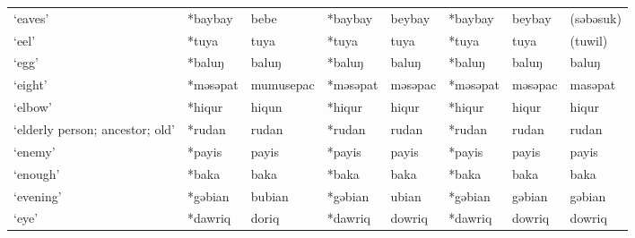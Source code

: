 \begin{landscape}
\begin{longtable}[c]{@{}p{3cm}<{\raggedright}p{2.75cm}<{\raggedright}p{2.75cm}<{\raggedright}p{2.75cm}<{\raggedright}p{2.75cm}<{\raggedright}p{2.75cm}<{\raggedright}p{2.75cm}<{\raggedright}p{2.75cm}<{\raggedright}@{}}
`eaves'                                              & *baybay      & bebe                          & *baybay        & beybay                     & *baybay          & beybay                   & (səbəsuk)                         \\
`eel'                                                & *tuya        & tuya                          & *tuya          & tuya                       & *tuya            & tuya                     & (tuwil)                           \\
`egg'                                                & *baluŋ       & baluŋ                         & *baluŋ         & baluŋ                      & *baluŋ           & baluŋ                    & baluŋ                             \\
`eight'                                              & *məsəpat     & mumusepac                     & *məsəpat       & məsəpac                    & *məsəpat         & məsəpac                  & masəpat                           \\
`elbow'                                              & *hiqur       & hiqun                         & *hiqur         & hiqur                      & *hiqur           & hiqur                    & hiqur                             \\
`elderly person; ancestor; old'                      & *rudan       & rudan                         & *rudan         & rudan                      & *rudan           & rudan                    & rudan                             \\
`enemy'                                              & *payis       & payis                         & *payis         & payis                      & *payis           & payis                    & payis                             \\
`enough'                                             & *baka        & baka                          & *baka          & baka                       & *baka            & baka                     & baka                              \\
`evening'                                            & *gəbian      & bubian                        & *gəbian        & ubian                      & *gəbian          & gəbian                   & gəbian                            \\
`eye'                                                & *dawriq      & doriq                         & *dawriq        & dowriq                     & *dawriq          & dowriq                   & dowriq                            \\

\end{longtable}
\end{landscape}

